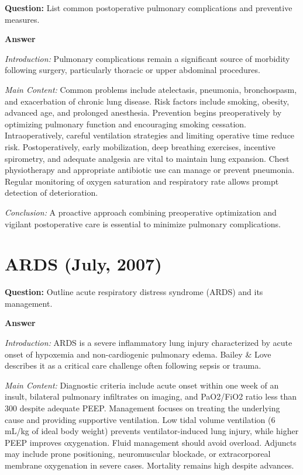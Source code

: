 \documentclass{article}
\begin{document}
\textbf{Question:} List common postoperative pulmonary complications and preventive measures.

\textbf{Answer}

\emph{Introduction:} Pulmonary complications remain a significant source of morbidity following surgery, particularly thoracic or upper abdominal procedures.

\emph{Main Content:} Common problems include atelectasis, pneumonia, bronchospasm, and exacerbation of chronic lung disease. Risk factors include smoking, obesity, advanced age, and prolonged anesthesia. Prevention begins preoperatively by optimizing pulmonary function and encouraging smoking cessation. Intraoperatively, careful ventilation strategies and limiting operative time reduce risk. Postoperatively, early mobilization, deep breathing exercises, incentive spirometry, and adequate analgesia are vital to maintain lung expansion. Chest physiotherapy and appropriate antibiotic use can manage or prevent pneumonia. Regular monitoring of oxygen saturation and respiratory rate allows prompt detection of deterioration.

\emph{Conclusion:} A proactive approach combining preoperative optimization and vigilant postoperative care is essential to minimize pulmonary complications.


\section{ARDS (July, 2007)}


\textbf{Question:} Outline acute respiratory distress syndrome (ARDS) and its management.

\textbf{Answer}

\emph{Introduction:} ARDS is a severe inflammatory lung injury characterized by acute onset of hypoxemia and non-cardiogenic pulmonary edema. Bailey \& Love describes it as a critical care challenge often following sepsis or trauma.

\emph{Main Content:} Diagnostic criteria include acute onset within one week of an insult, bilateral pulmonary infiltrates on imaging, and PaO2/FiO2 ratio less than 300 despite adequate PEEP. Management focuses on treating the underlying cause and providing supportive ventilation. Low tidal volume ventilation (6 mL/kg of ideal body weight) prevents ventilator-induced lung injury, while higher PEEP improves oxygenation. Fluid management should avoid overload. Adjuncts may include prone positioning, neuromuscular blockade, or extracorporeal membrane oxygenation in severe cases. Mortality remains high despite advances.
\end{document}
